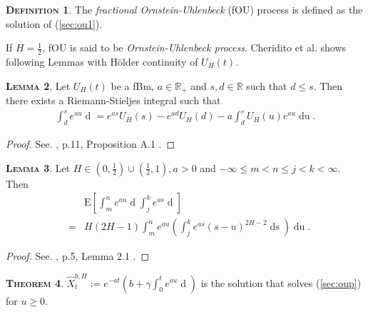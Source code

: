 \documentclass[a4paper, twoside, 11pt]{article}
\theoremstyle{definition}
\newtheorem{definition}{\scshape Definition}[section]
\newtheorem{theorem}[definition]{\scshape Theorem}
\newtheorem{lemma}[definition]{\scshape Lemma}
\newcommand{\brkt}[1]{\left({#1} \right)}
\begin{document}
\begin{definition}
  The \emph{fractional Ornstein-Uhlenbeck} (fOU) process is defined as the solution of (\ref{sec:ou1}).
\end{definition}

If $H=\frac{1}{2}$, fOU is said to be \emph{Ornstein-Uhlenbeck process}. Cheridito et al.\cite{chriel} shows following Lemmas with H\"older continuity of $U_H(t)$.
\begin{lemma}
  Let $U_H(t)$ be a fBm, $a \in \mathbb{R}_+$ and $s, d\in \mathbb{R}$ such that $d\le s$. Then there exists a Riemann-Stieljes integral such that 
  \begin{eqnarray}
	\int_d^s e^{au} \mathop{dU_H(u)} = e^{as} U_H(s) - e^{ad} U_H(d) - a\int_d^s U_H(u) e^{au}\mathop{du}.
	\label{sec:rie}
  \end{eqnarray}
\end{lemma}

\begin{proof}
  See. \cite{chriel}, p.11, Proposition A.1 .
\end{proof}

\begin{lemma}
  Let $H \in (0, \frac{1}{2}) \cup (\frac{1}{2}, 1), a >0$ and $-\infty\le m < n \le j < k < \infty.$ Then 
  \begin{eqnarray*}
	&&\mathrm{E}[\int_m^n e^{au}\mathop{dU_H(u)}\int_j^k e^{as}\mathop{dU_H(s)}]\\
	&=& H(2H-1)\int_m^n e^{au} \brkt{\int_j^k e^{as}(s-u)^{2H-2}\mathop{ds}}\mathop{du}.
\end{eqnarray*}
  \label{sec:lemma2}
\end{lemma}

\begin{proof}
  See. \cite{chriel}, p.5, Lemma 2.1 .
\end{proof}

\begin{theorem}
  $\hat{X}^{b,H}_t := e^{-at} \brkt{b + \gamma\int_0^t e^{au}\mathop{dU_H(u)}}$ is the solution that solves (\ref{sec:oup}) for $u\ge 0$.
  \label{sec:sol}
\end{theorem}
\end{document}
